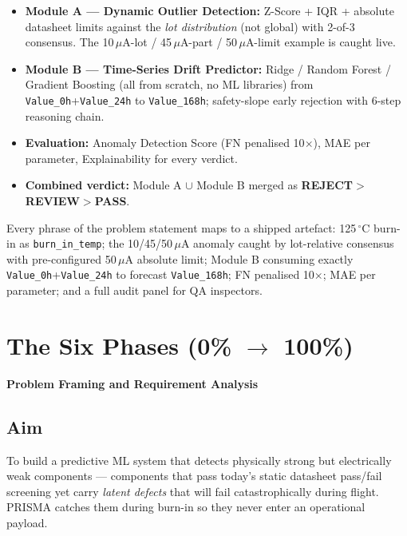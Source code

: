 \documentclass[11pt,a4paper]{article}
\newcommand{\code}[1]{\texttt{\small #1}}
\newcommand{\keys}[1]{\textbf{\sffamily#1}}
\newcommand{\whatbox}[1]{%
  \par\vspace{0.6em}\noindent
  \begin{tcolorbox}[colback=solgreen!8,colframe=solgreen,
    title={\sffamily\bfseries\color{white}Why PRISMA satisfies the requirements 100\%},arc=2pt,boxrule=1pt]
    #1
  \end{tcolorbox}\par\vspace{0.4em}}
\newcommand{\phasebox}[3]{\par\vspace{1em}\noindent
  \begin{tcolorbox}[colback=isroblue!6,colframe=isroblue,
    title={\sffamily\bfseries\color{white}#1 \quad [Progress: #2]},arc=2pt,boxrule=1.2pt]
    \textbf{#3}
  \end{tcolorbox}\par\vspace{0.4em}}
\begin{document}
\begin{itemize}[leftmargin=1.5em]
  \item \textbf{Module A --- Dynamic Outlier Detection:} Z-Score + IQR + absolute datasheet limits
        against the \emph{lot distribution} (not global) with 2-of-3 consensus. The
        10\,$\mu$A-lot / 45\,$\mu$A-part / 50\,$\mu$A-limit example is caught live.
  \item \textbf{Module B --- Time-Series Drift Predictor:} Ridge / Random Forest / Gradient
        Boosting (all from scratch, no ML libraries) from \code{Value\_0h}+\code{Value\_24h} to
        \code{Value\_168h}; safety-slope early rejection with 6-step reasoning chain.
  \item \textbf{Evaluation:} Anomaly Detection Score (FN penalised 10$\times$), MAE per parameter,
        Explainability for every verdict.
  \item \textbf{Combined verdict:} Module A $\cup$ Module B merged as
        \keys{REJECT}$>$\keys{REVIEW}$>$\keys{PASS}.
\end{itemize}

\whatbox{Every phrase of the problem statement maps to a shipped artefact: 125\,$^{\circ}$C
  burn-in as \code{burn\_in\_temp}; the 10/45/50\,$\mu$A anomaly caught by lot-relative
  consensus with pre-configured 50\,$\mu$A absolute limit; Module B consuming exactly
  \code{Value\_0h}+\code{Value\_24h} to forecast \code{Value\_168h}; FN penalised 10$\times$;
  MAE per parameter; and a full audit panel for QA inspectors.}

\section{The Six Phases (0\% $\rightarrow$ 100\%)}

\phasebox{Phase 1}{0\% -- 15\%}{Problem Framing and Requirement Analysis}

\subsection*{Aim}
To build a predictive ML system that detects physically strong but electrically weak
components --- components that pass today's static datasheet pass/fail screening yet carry
\emph{latent defects} that will fail catastrophically during flight. PRISMA catches them during
burn-in so they never enter an operational payload.
\end{document}
